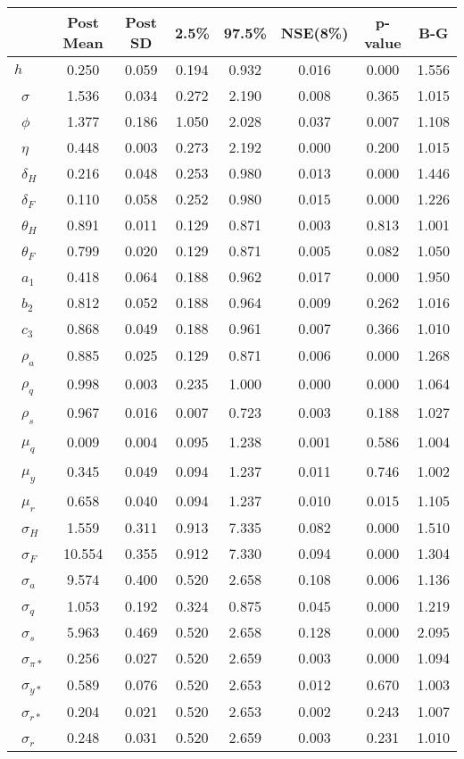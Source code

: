 \begin{tiny}\begin{tabular}{lccccccc}
\hline
&\textbf{Post Mean}&\textbf{Post SD}&\textbf{2.5\%}&\textbf{97.5\%}&\textbf{NSE(8\%)}&\textbf{p-value}&\textbf{B-G}\\\hline
\textbf{$ h             $}&0.250&0.059&0.194&0.932&0.016&0.000&1.556\\\
\textbf{$ \sigma        $}&1.536&0.034&0.272&2.190&0.008&0.365&1.015\\\
\textbf{$ \phi          $}&1.377&0.186&1.050&2.028&0.037&0.007&1.108\\\
\textbf{$ \eta          $}&0.448&0.003&0.273&2.192&0.000&0.200&1.015\\\
\textbf{$ \delta_{H}    $}&0.216&0.048&0.253&0.980&0.013&0.000&1.446\\\
\textbf{$ \delta_{F}    $}&0.110&0.058&0.252&0.980&0.015&0.000&1.226\\\
\textbf{$ \theta_{H}    $}&0.891&0.011&0.129&0.871&0.003&0.813&1.001\\\
\textbf{$ \theta_{F}    $}&0.799&0.020&0.129&0.871&0.005&0.082&1.050\\\
\textbf{$ a_{1}         $}&0.418&0.064&0.188&0.962&0.017&0.000&1.950\\\
\textbf{$ b_{2}         $}&0.812&0.052&0.188&0.964&0.009&0.262&1.016\\\
\textbf{$ c_{3}         $}&0.868&0.049&0.188&0.961&0.007&0.366&1.010\\\
\textbf{$ \rho_{a}      $}&0.885&0.025&0.129&0.871&0.006&0.000&1.268\\\
\textbf{$ \rho_{q}      $}&0.998&0.003&0.235&1.000&0.000&0.000&1.064\\\
\textbf{$ \rho_{s}      $}&0.967&0.016&0.007&0.723&0.003&0.188&1.027\\\
\textbf{$ \mu_{q}       $}&0.009&0.004&0.095&1.238&0.001&0.586&1.004\\\
\textbf{$ \mu_{y}       $}&0.345&0.049&0.094&1.237&0.011&0.746&1.002\\\
\textbf{$ \mu_{r}       $}&0.658&0.040&0.094&1.237&0.010&0.015&1.105\\\
\textbf{$ \sigma_{H}    $}&1.559&0.311&0.913&7.335&0.082&0.000&1.510\\\
\textbf{$ \sigma_{F}    $}&10.554&0.355&0.912&7.330&0.094&0.000&1.304\\\
\textbf{$ \sigma_{a}    $}&9.574&0.400&0.520&2.658&0.108&0.006&1.136\\\
\textbf{$ \sigma_{q}    $}&1.053&0.192&0.324&0.875&0.045&0.000&1.219\\\
\textbf{$ \sigma_{s}    $}&5.963&0.469&0.520&2.658&0.128&0.000&2.095\\\
\textbf{$ \sigma_{\pi*} $}&0.256&0.027&0.520&2.659&0.003&0.000&1.094\\\
\textbf{$ \sigma_{y*}   $}&0.589&0.076&0.520&2.653&0.012&0.670&1.003\\\
\textbf{$ \sigma_{r*}   $}&0.204&0.021&0.520&2.653&0.002&0.243&1.007\\\
\textbf{$ \sigma_{r}    $}&0.248&0.031&0.520&2.659&0.003&0.231&1.010\\\hline
\end{tabular}
\end{tiny}